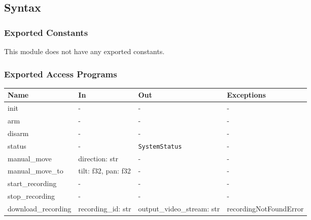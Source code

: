 \documentclass[12pt, titlepage]{article}
\begin{document}
\subsection{Syntax}

\subsubsection{Exported Constants}

This module does not have any exported constants.

\subsubsection{Exported Access Programs}

\begin{center}
  \begin{tabular}{p{3cm} p{4cm} p{4cm} p{3.5cm}}
    \hline
    \textbf{Name}       & \textbf{In}         & \textbf{Out}               & \textbf{Exceptions}    \\
    \hline
    init                & -                   & -                          & -                      \\
    \hline
    arm                 & -                   & -                          & -                      \\
    \hline
    disarm              & -                   & -                          & -                      \\
    \hline
    status              & -                   & \texttt{SystemStatus}      & -                      \\
    \hline
    manual\_move        & direction: str      & -                          & -                      \\
    \hline
    manual\_move\_to    & tilt: f32, pan: f32 & -                          & -                      \\
    \hline
    start\_recording    & -                   & -                          & -                      \\
    \hline
    stop\_recording     & -                   & -                          & -                      \\
    \hline
    download\_recording & recording\_id: str  & output\_video\_stream: str & recordingNotFoundError \\
    \hline
  \end{tabular}
\end{center}
\end{document}
